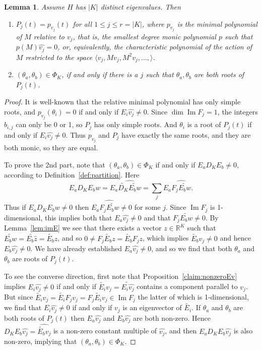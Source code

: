 \documentclass[11pt]{article}
\newtheorem{lemma}[theo]{Lemma}
\theoremstyle{definition}
\numberwithin{equation}{section}
\newcommand\+{\mkern2mu}
\newcommand{\R}{\mathbb{R}}
\newcommand{\1}{\mathbf 1}
\DeclareMathOperator{\im}{Im}
\begin{document}
\begin{lemma}\label{lem:K_distinct} Assume $H$ has $|K|$ distinct eigenvalues. Then
\begin{enumerate} 
\item
$P_j(t) = p_{v_j}(t)$ for all $1 \leq j \leq r = |K|$, where $p_{v_j}$ is the minimal polynomial of $M$ relative to $v_j$, that is, the smallest degree monic polynomial $p$ such that $p(M)\hat{v_j} = 0$, or, equivalently, the characteristic polynomial of the action of $M$ restricted to the space $\langle v_j, M v_j, M^2 v_j, \dots, \rangle$.  

\item $(\theta_a,\theta_b) \in \Phi_K$, if and only if there is a $j$ such that $\theta_a, \theta_b$ are both roots of $P_j(t)$. 
\end{enumerate}
\end{lemma}

\begin{proof} It is well-known that the relative minimal polynomial has only simple roots, and $p_{v_j}(\theta_i) = 0$ if and only if $E_i \hat{v_j} \neq 0$. Since $\dim\im F_j = 1$, the integers $b_{i,j}$ can only be 0 or 1, so $P_j$ has only simple roots. And $\theta_i$ is a root of $P_j(t)$ if and only if $E_i \hat{v_j} \neq 0$. Thus $p_{v_j}$ and $P_j$ have exactly the same roots, and they are both monic, so they are equal. 

To prove the 2nd part, note that $(\theta_a,\theta_b) \in \Phi_K$ if and only if $E_a D_K E_b \neq 0$, according to Definition~\ref{def:partition}. Here 
\[E_a D_K E_b w = E_a \widehat{\widetilde{D_K} \widetilde{E_b w}} = \sum_j E_a \widehat{F_j \widetilde{E_b w}}.\] Thus if $E_a D_K E_b w \neq 0$ then $E_a \widehat{F_j \widetilde{E_b w}} \neq 0$ for some $j$. Since $\im F_j$ is 1-dimensional, this implies both that $E_a \hat{v_j} \neq 0$ and that $F_j \widetilde{E_b w} \neq 0$. By Lemma~\ref{lem:imE} we see that there exists a vector $z \in \R^K$ such that $\widetilde{E_b w} = \widetilde{E_b  \hat{z}} = \tilde{E_b} z$, and so $0 \neq F_j \tilde{E_b} z= \tilde{E_b} F_j z$, which implies $\tilde{E_b} v_j \neq 0$ and hence $E_b \hat{v_j} \neq 0$. We have already established $E_a \hat{v_j} \neq 0$, and so we find that both $\theta_a$ and $\theta_b$ are roots of $P_j(t)$.

To see the converse direction, first note that
Proposition~\ref{claim:nonzeroEv} implies $E_i \hat{v_j} \neq 0$  if and only if $\tilde{E_i}v_j = \widetilde{E_i \hat{v_j}}$ contains a component parallel to $v_j$. But since $\tilde{E_i} v_j = \tilde{E_i} F_j v_j = F_j \tilde{E_i}v_j \in \im F_j$ the latter of which is 1-dimensional, we find that $E_i \hat{v_j} \neq 0$ if and only if $v_j$ is an eigenvector of $\widetilde{E_i}$. If $\theta_a$ and $\theta_b$ are both roots of $P_j(t)$ then $E_a \hat{v_j}$ and $E_b \hat{v_j}$ are both non-zero. Hence $D_K E_b \hat{v_j} = \widehat{ \tilde{E_b} v_j}$ is a non-zero constant multiple of $\hat{v_j}$, and then $E_a D_K E_b \hat{v_j}$ is also non-zero, implying that $(\theta_a, \theta_b) \in \Phi_K$.
\end{proof}
\end{document}
